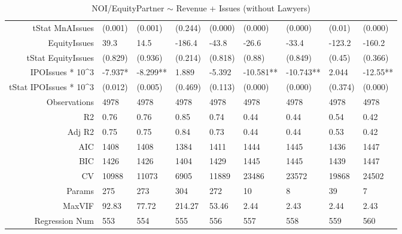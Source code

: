 \begin{table}[ht]
\begin{tabular}{rllllllll}
  tStat MnAIssues & (0.001) & (0.001) & (0.244) & (0.000) & (0.000) & (0.000) & (0.01) & (0.000) \\ 
  EquityIssues & 39.3 & 14.5 & -186.4 & -43.8 & -26.6 & -33.4 & -123.2 & -160.2 \\ 
  tStat EquityIssues & (0.829) & (0.936) & (0.214) & (0.818) & (0.88) & (0.849) & (0.45) & (0.366) \\ 
  IPOIssues * 10^3 & -7.937* & -8.299** & 1.889 & -5.392 & -10.581** & -10.743** & 2.044 & -12.55** \\ 
  tStat IPOIssues * 10^3 & (0.012) & (0.005) & (0.469) & (0.113) & (0.000) & (0.000) & (0.374) & (0.000) \\ 
  Observations & 4978 & 4978 & 4978 & 4978 & 4978 & 4978 & 4978 & 4978 \\ 
  R2 & 0.76 & 0.76 & 0.85 & 0.74 & 0.44 & 0.44 & 0.54 & 0.42 \\ 
  Adj R2 & 0.75 & 0.75 & 0.84 & 0.73 & 0.44 & 0.44 & 0.53 & 0.42 \\ 
  AIC & 1408 & 1408 & 1384 & 1411 & 1444 & 1445 & 1436 & 1447 \\ 
  BIC & 1426 & 1426 & 1404 & 1429 & 1445 & 1445 & 1439 & 1447 \\ 
  CV & 10988 & 11073 & 6905 & 11889 & 23486 & 23572 & 19868 & 24502 \\ 
  Params & 275 & 273 & 304 & 272 & 10 & 8 & 39 & 7 \\ 
  MaxVIF & 92.83 & 77.72 & 214.27 & 53.46 & 2.44 & 2.43 & 2.44 & 2.43 \\ 
  Regression Num & 553 & 554 & 555 & 556 & 557 & 558 & 559 & 560 \\ 
   \hline
\end{tabular}
\caption{NOI/EquityPartner $\sim$ Revenue + Issues (without Lawyers)} 
\end{table}
